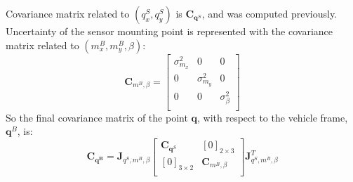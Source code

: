 Covariance matrix related to $(q^S_x, q^S_y)$ is $\mathbf{C}_{\mathbf{q}^S}$, and was computed previously. Uncertainty of the sensor mounting point is represented with the covariance matrix related to $(m^B_x, m^B_y, \beta)$: 
\begin{equation}
 \mathbf{C}_{m^B,\beta} = 
 \left[
 \begin{array}{ccc}
 \sigma^2_{m_x} & 0 & 0  \\
 0 & \sigma^2_{m_y} & 0 \\
 0 & 0 & \sigma^2_{\beta} \\
 \end{array}
 \right]
\end{equation}
So the final covariance matrix of the point $\mathbf{q}$, with respect to the vehicle frame, $\mathbf{q}^B$, is: 
\begin{equation}
 \mathbf{C}_{\mathbf{q^B}} = 
 \mathbf{J}_{q^S,m^B,\beta}
 \left[
 \begin{array}{cc}
 \mathbf{C}_{\mathbf{q}^S} & \left[0\right]_{2\times 3} \\
 \left[0\right]_{3\times 2} & \mathbf{C}_{m^B,\beta} \\
 \end{array}
 \right]
 \mathbf{J}_{q^S,m^B,\beta}^T
\end{equation}

